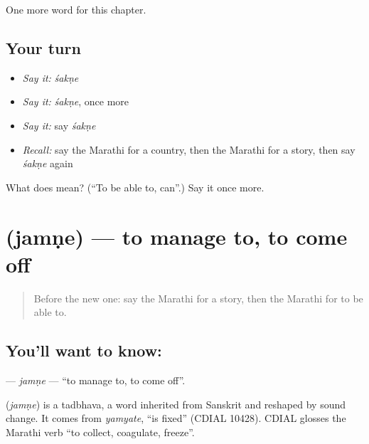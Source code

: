 \begin{grammarlens}[title={What you've built}]
One more word for this chapter.
\end{grammarlens}

\subsection*{Your turn}
\begin{itemize}
\raggedright
  \item \emph{Say it:} \emph{śakṇe}
  \item \emph{Say it:} \emph{śakṇe}, once more
  \item \emph{Say it:} say \emph{śakṇe}
  \item \emph{Recall:} say the Marathi for a country, then the Marathi for a story, then say \emph{śakṇe} again
\end{itemize}

\begin{tcolorbox}[breakable,colback=teal!4,colframe=teal!35!black,title={Before you move on}]
What does  mean? (\textquotedblleft{}To be able to, can\textquotedblright{}.) Say it once more.
\end{tcolorbox}
\section[\texorpdfstring{\mr{जमणे} (jamṇe)}{जमणे (jamṇe)}]{ (jamṇe) — to manage to, to come off}

\label{lesson:MR-C121-jamne}



\begin{quote}
Before the new one: say the Marathi for a story, then the Marathi for to be able to.
\end{quote}

\subsection*{You'll want to know: }
\textbf{} — \emph{jamṇe} — \textquotedblleft{}to manage to, to come off\textquotedblright{}.

\begin{cousinweb}
\textbf{} (\emph{jamṇe}) is a tadbhava, a word inherited from Sanskrit and reshaped by sound change. It comes from \emph{yamyate}, \textquotedblleft{}is fixed\textquotedblright{} (CDIAL 10428). CDIAL glosses the Marathi verb \textquotedblleft{}to collect, coagulate, freeze\textquotedblright{}.
\end{cousinweb}

